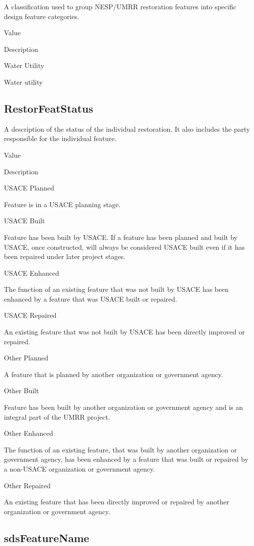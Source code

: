 \documentclass[
  letterpaper,
  DIV=11,
  numbers=noendperiod]{scrreprt}
\begin{document}
A classification used to group NESP/UMRR restoration features into
specific design feature categories.

Value

Description

Water Utility

Water utility

\subsection{RestorFeatStatus}\label{restorfeatstatus-25}

A description of the status of the individual restoration. It also
includes the party responsible for the individual feature.

Value

Description

USACE Planned

Feature is in a USACE planning stage.

USACE Built

Feature has been built by USACE. If a feature has been planned and built
by USACE, once constructed, will always be considered USACE built even
if it has been repaired under later project stages.

USACE Enhanced

The function of an existing feature that was not built by USACE has been
enhanced by a feature that was USACE built or repaired.

USACE Repaired

An existing feature that was not built by USACE has been directly
improved or repaired.

Other Planned

A feature that is planned by another organization or government agency.

Other Built

Feature has been built by another organization or government agency and
is an integral part of the UMRR project.

Other Enhanced

The function of an existing feature, that was built by another
organization or government agency, has been enhanced by a feature that
was built or repaired by a non-USACE organization or government agency.

Other Repaired

An existing feature that has been directly improved or repaired by
another organization or government agency.

\subsection{sdsFeatureName}\label{sdsfeaturename-25}
\end{document}
